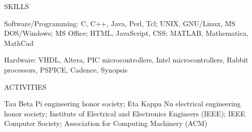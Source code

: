 \documentclass[letterpaper,10pt]{article}
\begin{document}
\bigskip

\noindent SKILLS

\parbox[t]{\columnwidth}{Software/Programming: C, C++, Java, Perl,
Tcl; UNIX, GNU/Linux, MS DOS/Windows; MS Office; HTML, JavaScript,
CSS; MATLAB, Mathematica, MathCad}

\smallskip

\parbox[t]{\columnwidth}{Hardware: VHDL, Altera, PIC microcontrollers,
Intel microcontrollers, Rabbit processors, PSPICE, Cadence, Synopsis}

\bigskip

\noindent ACTIVITIES

\parbox[t]{\columnwidth}{Tau Beta Pi engineering honor society; Eta
Kappa Nu electrical engineering honor society; Institute of Electrical
and Electronics Engineers (IEEE); IEEE Computer Society; Association
for Computing Machinery (ACM)}
\end{document}

